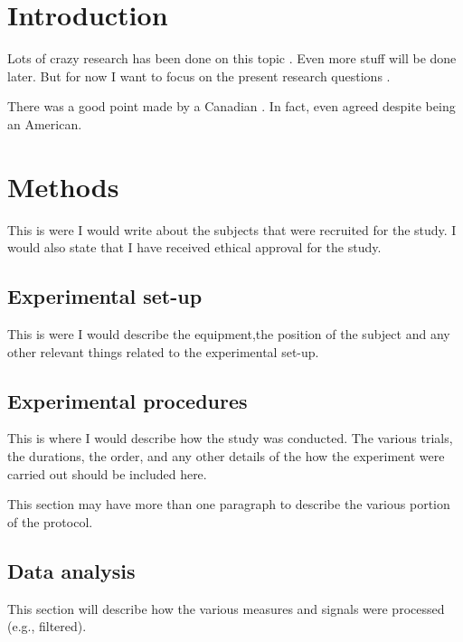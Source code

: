 \documentclass[letterpaper,11pt]{article}
\begin{document}
\newpage
\section*{Introduction}

Lots of crazy research has been done on this topic \citep{Heroux:2015}. 
Even more stuff will be done later. 
But for now I want to focus on the present research questions \citep{Butler2003}.

There was a good point made by a Canadian \citep{Brownstone2006}. 
In fact, \cite{Sawczuk1995} even agreed despite being an American.

\lipsum[1]


\section*{Methods}

This is were I would write about the subjects that were recruited for the study. 
I would also state that I have received ethical approval for the study.

\subsection*{Experimental set-up}

This is were I would describe the equipment,the position of the subject and any other relevant things related to the experimental set-up.

\subsection*{Experimental procedures}

This is where I would describe how the study was conducted. 
The various trials, the durations, the order, and any other details of the how the experiment were carried out should be included here.

This section may have more than one paragraph to describe the various portion of the protocol.

\subsection*{Data analysis}

This section will describe how the various measures and signals were processed (e.g., filtered). 
\end{document}
